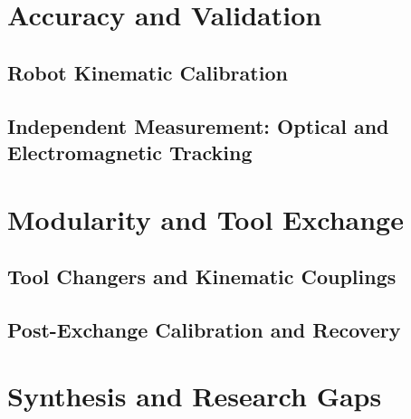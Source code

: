 \section{Accuracy and Validation}
\label{sec:lit-validation}

\subsection{Robot Kinematic Calibration}
\label{sec:lit-calibration}

\subsection{Independent Measurement: Optical and Electromagnetic Tracking}
\label{sec:lit-tracking}

\section{Modularity and Tool Exchange}
\label{sec:lit-modularity}

\subsection{Tool Changers and Kinematic Couplings}
\label{sec:lit-couplings}

\subsection{Post-Exchange Calibration and Recovery}
\label{sec:lit-post-swap}

\section{Synthesis and Research Gaps}
\label{sec:lit-gaps}
